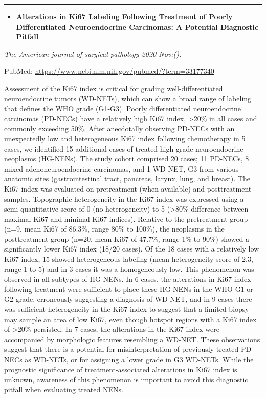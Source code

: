 \documentclass[
]{article}
\providecommand{\tightlist}{%
  \setlength{\itemsep}{0pt}\setlength{\parskip}{0pt}}
\begin{document}
\begin{center}\rule{0.5\linewidth}{0.5pt}\end{center}

\begin{itemize}
\tightlist
\item
  \textbf{Alterations in Ki67 Labeling Following Treatment of Poorly
  Differentiated Neuroendocrine Carcinomas: A Potential Diagnostic
  Pitfall}
\end{itemize}

\emph{The American journal of surgical pathology 2020 Nov;():}

PubMed: \url{https://www.ncbi.nlm.nih.gov/pubmed/?term=33177340}

Assessment of the Ki67 index is critical for grading well-differentiated
neuroendocrine tumors (WD-NETs), which can show a broad range of
labeling that defines the WHO grade (G1-G3). Poorly differentiated
neuroendocrine carcinomas (PD-NECs) have a relatively high Ki67 index,
\textgreater20\% in all cases and commonly exceeding 50\%. After
anecdotally observing PD-NECs with an unexpectedly low and heterogeneous
Ki67 index following chemotherapy in 5 cases, we identified 15
additional cases of treated high-grade neuroendocrine neoplasms
(HG-NENs). The study cohort comprised 20 cases; 11 PD-NECs, 8 mixed
adenoneuroendocrine carcinomas, and 1 WD-NET, G3 from various anatomic
sites (gastrointestinal tract, pancreas, larynx, lung, and breast). The
Ki67 index was evaluated on pretreatment (when available) and
posttreatment samples. Topographic heterogeneity in the Ki67 index was
expressed using a semi-quantitative score of 0 (no heterogeneity) to 5
(\textgreater80\% difference between maximal Ki67 and minimal Ki67
indices). Relative to the pretreatment group (n=9, mean Ki67 of 86.3\%,
range 80\% to 100\%), the neoplasms in the posttreatment group (n=20,
mean Ki67 of 47.7\%, range 1\% to 90\%) showed a significantly lower
Ki67 index (18/20 cases). Of the 18 cases with a relatively low Ki67
index, 15 showed heterogeneous labeling (mean heterogeneity score of
2.3, range 1 to 5) and in 3 cases it was a homogeneously low. This
phenomenon was observed in all subtypes of HG-NENs. In 6 cases, the
alterations in Ki67 index following treatment were sufficient to place
these HG-NENs in the WHO G1 or G2 grade, erroneously suggesting a
diagnosis of WD-NET, and in 9 cases there was sufficient heterogeneity
in the Ki67 index to suggest that a limited biopsy may sample an area of
low Ki67, even though hotspot regions with a Ki67 index of
\textgreater20\% persisted. In 7 cases, the alterations in the Ki67
index were accompanied by morphologic features resembling a WD-NET.
These observations suggest that there is a potential for
misinterpretation of previously treated PD-NECs as WD-NETs, or for
assigning a lower grade in G3 WD-NETs. While the prognostic significance
of treatment-associated alterations in Ki67 index is unknown, awareness
of this phenomenon is important to avoid this diagnostic pitfall when
evaluating treated NENs.
\end{document}
